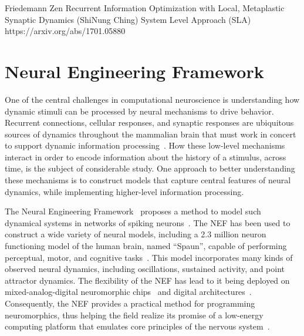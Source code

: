 Friedemann Zen
Recurrent Information Optimization with Local, Metaplastic Synaptic Dynamics (ShiNung Ching)
System Level Approach (SLA) https://arxiv.org/abs/1701.05880


\section{Neural Engineering Framework}

One of the central challenges in computational neuroscience is understanding how dynamic stimuli can be processed by neural mechanisms to drive behavior.
Recurrent connections, cellular responses, and synaptic responses are ubiquitous sources of dynamics throughout the mammalian brain that must work in concert to support dynamic information processing~\citep{kandel2000principles}.
How these low-level mechanisms interact in order to encode information about the history of a stimulus, across time, is the subject of considerable study.
One approach to better understanding these mechanisms is to construct models that capture central features of neural dynamics, while implementing higher-level information processing.




The Neural Engineering Framework~\citep[NEF;][]{eliasmith1999developing, eliasmith2003a} proposes a method to model such dynamical systems in networks of spiking neurons~\citep[see][for reviews of other methods]{abbott2016building, deneve2016efficient}.
The NEF has been used to construct a wide variety of neural models, including a 2.3 million neuron functioning model of the human brain, named ``Spaun'', capable of performing perceptual, motor, and cognitive tasks~\citep{eliasmith2012}.
This model incorporates many kinds of observed neural dynamics, including oscillations, sustained activity, and point attractor dynamics.
The flexibility of the NEF has lead to it being deployed on mixed-analog-digital neuromorphic chips~\citep{choudhary2012silicon, corradi2014, voelker2017iscas, voelker2017neuromorphic} and digital architectures~\citep{bekolay2013, wang2014compact, mundy2015efficient, berzish2016}.
Consequently, the NEF provides a practical method for programming neuromorphics, thus helping the field realize its promise of a low-energy computing platform that emulates core principles of the nervous system~\citep{boahen2017neuromorph}.


